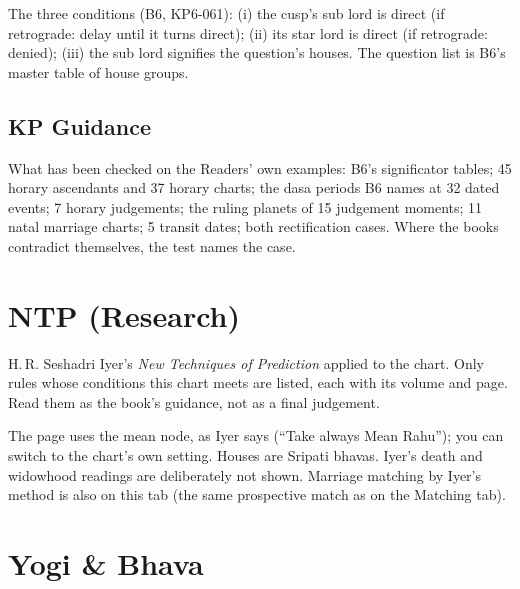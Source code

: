 \documentclass[11pt, a4paper]{article}
\newcommand{\shot}[1]{}
\begin{document}
The three conditions (B6, KP6-061): (i) the cusp's sub lord is direct (if retrograde: delay until it
turns direct); (ii) its star lord is direct (if retrograde: denied); (iii) the sub lord signifies the
question's houses. The question list is B6's master table of house groups.

\subsection{KP Guidance}
\shot{kpguide}

\begin{keybox}\kidea What has been checked on the Readers' own examples: B6's significator tables; 45 horary
ascendants and 37 horary charts; the dasa periods B6 names at 32 dated events; 7 horary judgements; the
ruling planets of 15 judgement moments; 11 natal marriage charts; 5 transit dates; both rectification
cases. Where the books contradict themselves, the test names the case.\end{keybox}

\section{NTP (Research)}
\label{sec:ntp}
H.\,R. Seshadri Iyer's \emph{New Techniques of Prediction} applied to the chart. Only rules whose
conditions this chart meets are listed, each with its volume and page. Read them as the book's guidance,
not as a final judgement.

\shot{ntpguide}
\shot{ntpyoga}
\shot{ntpplanet}
\shot{ntpdasha}

\begin{notebox}The page uses the mean node, as Iyer says (``Take always Mean Rahu''); you can switch to
the chart's own setting. Houses are Sripati bhavas. Iyer's death and widowhood readings are deliberately
not shown. Marriage matching by Iyer's method is also on this tab (the same prospective match as on the
Matching tab).\end{notebox}

\section{Yogi \& Bhava}
\label{sec:yogi}
\shot{ybyogi}
\shot{ybbhava}
\shot{ybtable}
\end{document}
